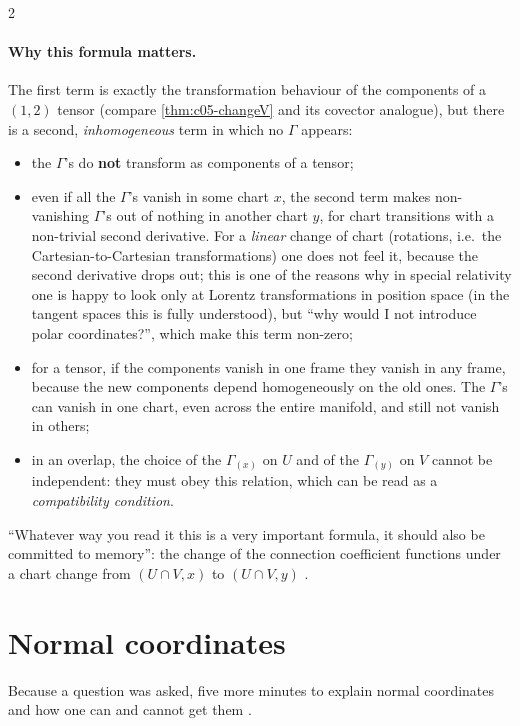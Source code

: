 \begin{paracol}{2}
\paragraph{Why this formula matters.} The first term is exactly the transformation behaviour of the components of a $(1,2)$ tensor (compare \cref{thm:c05-changeV} and its covector analogue), but there is a second, \emph{inhomogeneous} term in which no $\Gamma$ appears:
\begin{itemize}
  \item the $\Gamma$'s do \textbf{not} transform as components of a tensor;
  \item even if all the $\Gamma$'s vanish in some chart $x$, the second term makes non-vanishing $\Gamma$'s out of nothing in another chart $y$, for chart transitions with a non-trivial second derivative. For a \emph{linear} change of chart (rotations, i.e.\ the Cartesian-to-Cartesian transformations) one does not feel it, because the second derivative drops out; this is one of the reasons why in special relativity one is happy to look only at Lorentz transformations in position space (in the tangent spaces this is fully understood), but ``why would I not introduce polar coordinates?'', which make this term non-zero;
  \item for a tensor, if the components vanish in one frame they vanish in any frame, because the new components depend homogeneously on the old ones. The $\Gamma$'s can vanish in one chart, even across the entire manifold, and still not vanish in others;
  \item in an overlap, the choice of the $\Gamma_{(x)}$ on $U$ and of the $\Gamma_{(y)}$ on $V$ cannot be independent: they must obey this relation, which can be read as a \emph{compatibility condition}.
\end{itemize}
``Whatever way you read it this is a very important formula, it should also be committed to memory'': the change of the connection coefficient functions under a chart change from $(U\cap V,x)$ to $(U\cap V,y)$
.

\section{Normal coordinates}\label{sec:c07-normal}

Because a question was asked, five more minutes to explain normal coordinates and how one can and cannot get them .


\end{paracol}
